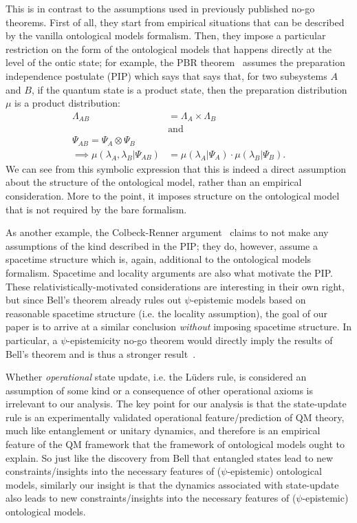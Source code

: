 \documentclass[%
 reprint, onecolumn, 12pt,
superscriptaddress,
nofootinbib,
 prx, 
]{quantumarticle}
\begin{document}
This is in contrast to the assumptions used in previously published
no-go theorems. First of all, they start from empirical situations
that can be described by the vanilla ontological models
formalism. Then, they impose a particular restriction on the form of
the ontological models that happens directly at the level of the ontic
state; for example, the PBR
theorem~\cite{Puseyrealityquantumstate2012} assumes the preparation
independence postulate (PIP) which says that says that, for two
subsystems $A$ and $B$, if the quantum state is a product state, then
the preparation distribution $\mu$ is a product distribution:
\begin{align}
  \label{eq:2} \Lambda_{AB} &= \Lambda_A\times\Lambda_B\\
&\text{and}\nonumber\\ \Psi_{AB}=\Psi_A\otimes\Psi_B
\quad&\nonumber\\\implies
\mu(\lambda_A,\lambda_B|\Psi_{AB})&=\mu(\lambda_A|\Psi_A)\cdot\mu(\lambda_B|\Psi_B).
\end{align} We can see from this symbolic expression that this is
indeed a direct assumption about the structure of the ontological
model, rather than an empirical consideration. More to the point, it
imposes structure on the ontological model that is not required by the
bare formalism.

As another example, the Colbeck-Renner
argument~\cite{Colbecksystemwavefunction2017} claims to not make any
assumptions of the kind described in the PIP; they do, however, assume
a spacetime structure which is, again, additional to the ontological
models formalism. Spacetime and locality arguments are also what
motivate the PIP. These relativistically-motivated considerations are
interesting in their own right, but since Bell's theorem already rules
out $\psi$-epistemic models based on reasonable spacetime structure
(i.e. the locality assumption), the goal of our paper is to arrive at
a similar conclusion \emph{without} imposing spacetime structure. In
particular, a $\psi$-epistemicity no-go theorem would directly imply
the results of Bell's theorem and is thus a stronger
result~\cite{Leiferquantumstatereal2014}.

Whether \emph{operational} state update, i.e. the L\"uders rule, is
considered an assumption of some kind or a consequence of other
operational axioms is irrelevant to our analysis.  The key point for
our analysis is that the state-update rule is an experimentally
validated operational feature/prediction of QM theory, much like
entanglement or unitary dynamics, and therefore is an empirical
feature of the QM framework that the framework of ontological models
ought to explain.  So just like the discovery from Bell that entangled
states lead to new constraints/insights into the necessary features of
($\psi$-epistemic) ontological models, similarly our insight is that
the dynamics associated with state-update also leads to new
constraints/insights into the necessary features of ($\psi$-epistemic)
ontological models.
\end{document}
